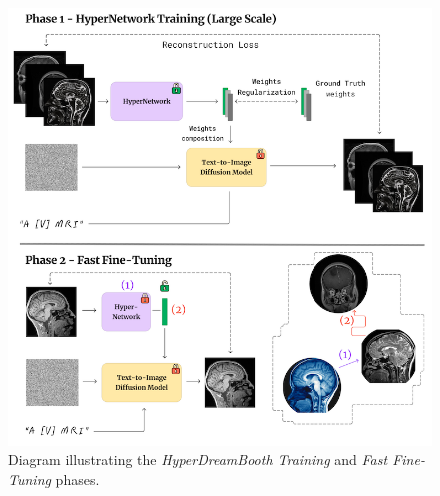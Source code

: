 \begin{figure}[H] 
\centering
\includegraphics[width=\columnwidth]{main/content/images/diagrams/hdb_diagram.png}
\caption{Diagram illustrating the \textit{HyperDreamBooth Training} and \textit{Fast Fine-Tuning} phases.}
\label{fig:hdb_diagram}
\end{figure}